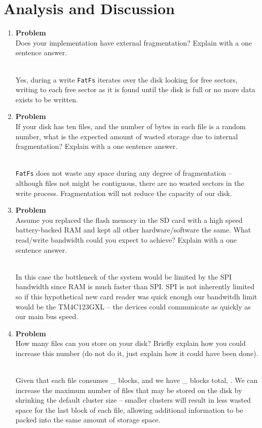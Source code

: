 \documentclass[12pt]{article}
\newenvironment{Ex}{\textbf{Problem}\vspace{.25em}\\}{}
\newcommand{\hbr}{\hfill\vspace{.25em}\\}
\begin{document}
\section{Analysis and Discussion}
\begin{enumerate}
\item
  \begin{Ex}
    Does your implementation have external fragmentation? Explain with
    a one sentence answer.
    \begin{solution} \hbr
      Yes, during a write \verb|FatFs| iterates over the disk looking
      for free sectors, writing to each free sector as it is found
      until the disk is full or no more data exists to be written.
    \end{solution}
  \end{Ex}
\item
  \begin{Ex}
    If your disk has ten files, and the number of bytes in each file
    is a random number, what is the expected amount of wasted storage
    due to internal fragmentation? Explain with a one sentence answer.
    \begin{solution} \hbr
      \verb|FatFs| does not waste any space during any degree of
      fragmentation -- although files not might be contiguous, there
      are no wasted sectors in the write process. Fragmentation will
      not reduce the capacity of our disk.
    \end{solution}
  \end{Ex}
\item
  \begin{Ex}
    Assume you replaced the flash memory in the SD card with a high
    speed battery-backed RAM and kept all other hardware/software the
    same. What read/write bandwidth could you expect to achieve?
    Explain with a one sentence answer.
    \begin{solution} \hbr
      In this case the bottleneck of the system would be limited by
      the SPI bandwidth since RAM is much faster than SPI. SPI is not
      inherently limited so if this hypothetical new card reader was
      quick enough our bandwitdh limit would be the TM4C123GXL -- the
      devices could communicate as quickly as our main bus speed.
    \end{solution}
  \end{Ex}
\item
  \begin{Ex}
    How many files can you store on your disk? Briefly explain how you
    could increase this number (do not do it, just explain how it
    could have been done).
    \begin{solution} \hbr
      Given that each file consumes _ blocks, and we have _ blocks
      total,
      . We can increase the maximum number of files that may be stored
      on the disk by shrinking the default cluster size -- smaller
      clusters will result in less wasted space for the last block of
      each file, allowing additional information to be packed into the
      same amount of storage space.



\end{solution}
\end{Ex}
\end{enumerate}
\end{document}
